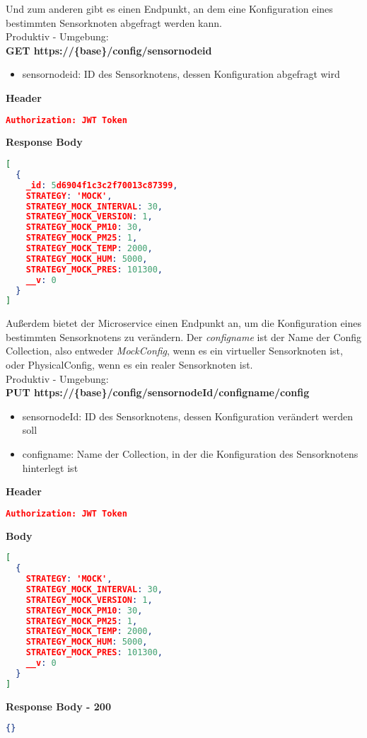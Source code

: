 Und zum anderen gibt es einen Endpunkt, an dem eine Konfiguration eines bestimmten Sensorknoten abgefragt werden kann.
\\
Produktiv - Umgebung:
\\
\textbf{GET https://\{base\}/config/sensornodeid}
\begin{itemize}
	\item sensornodeid: ID des Sensorknotens, dessen Konfiguration abgefragt wird
\end{itemize}
\textbf{Header}
\begin{lstlisting}[language=json,firstnumber=1,basicstyle=\footnotesize]
Authorization: JWT Token
\end{lstlisting}
\textbf{Response Body}
\begin{lstlisting}[language=json,firstnumber=1,basicstyle=\footnotesize]
[
  { 
    _id: 5d6904f1c3c2f70013c87399,
    STRATEGY: 'MOCK',
    STRATEGY_MOCK_INTERVAL: 30,
    STRATEGY_MOCK_VERSION: 1,
    STRATEGY_MOCK_PM10: 30,
    STRATEGY_MOCK_PM25: 1,
    STRATEGY_MOCK_TEMP: 2000,
    STRATEGY_MOCK_HUM: 5000,
    STRATEGY_MOCK_PRES: 101300,
    __v: 0
  }
]
\end{lstlisting} 

Außerdem bietet der Microservice einen Endpunkt an, um die Konfiguration eines bestimmten Sensorknotens zu verändern.
Der \textit{configname} ist der Name der Config Collection, also entweder \textit{MockConfig}, wenn es ein virtueller Sensorknoten ist, oder PhysicalConfig, wenn es ein realer Sensorknoten ist.
\\
Produktiv - Umgebung:
\\
\textbf{PUT https://\{base\}/config/sensornodeId/configname/config}
\begin{itemize}
	\item sensornodeId: ID des Sensorknotens, dessen Konfiguration verändert werden soll
	\item configname: Name der Collection, in der die Konfiguration des Sensorknotens hinterlegt ist
\end{itemize}
\textbf{Header}
\begin{lstlisting}[language=json,firstnumber=1,basicstyle=\footnotesize]
Authorization: JWT Token
\end{lstlisting}
\textbf{Body}
\begin{lstlisting}[language=json,firstnumber=1,basicstyle=\footnotesize]
[
  { 
    STRATEGY: 'MOCK',
    STRATEGY_MOCK_INTERVAL: 30,
    STRATEGY_MOCK_VERSION: 1,
    STRATEGY_MOCK_PM10: 30,
    STRATEGY_MOCK_PM25: 1,
    STRATEGY_MOCK_TEMP: 2000,
    STRATEGY_MOCK_HUM: 5000,
    STRATEGY_MOCK_PRES: 101300,
    __v: 0
  }
]
\end{lstlisting}
\textbf{Response Body - 200}
\begin{lstlisting}[language=json,firstnumber=1,basicstyle=\footnotesize]
{}
\end{lstlisting}

